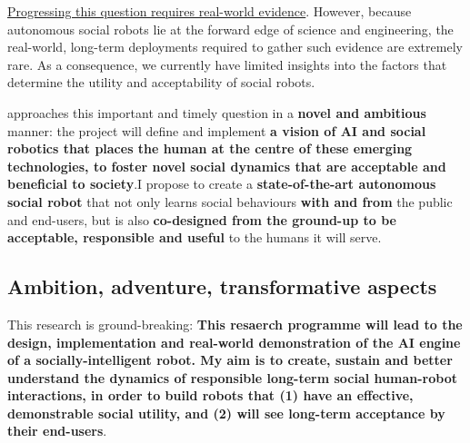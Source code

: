 \ul{Progressing this question requires real-world evidence}. However, because
autonomous social robots lie at the forward edge of science and engineering, the
real-world, long-term deployments required to gather such evidence are extremely
rare. As a consequence, we currently have limited insights into the factors that
determine the utility and acceptability of social robots.

\project approaches this important and timely question in a \textbf{novel and
ambitious} manner: the project will define and implement \textbf{a vision of AI
and social robotics that places the human at the centre of these emerging
technologies, to foster novel social dynamics that are acceptable and beneficial
to society}.I propose to create a \textbf{state-of-the-art autonomous social
robot} that not only learns social behaviours \textbf{with and from} the public
and end-users, but is also \textbf{co-designed from the ground-up to be
acceptable, responsible and useful} to the humans it will serve.





\subsection{Ambition, adventure, transformative aspects}

This research is ground-breaking: \textbf{This resaerch programme will lead to
the design, implementation and real-world demonstration of the AI engine of a
socially-intelligent robot.  My aim is to create, sustain and better understand
the dynamics of responsible long-term social human-robot interactions, in order
to build robots that (1) have an effective, demonstrable social utility, and (2)
will see long-term acceptance by their end-users}.


